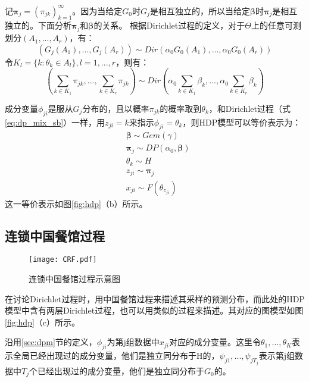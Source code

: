 记${\bm \pi}_j = {(\pi_{jk})}_{k=1}^\infty$。因为当给定$G_0$时$G_j$是相互独立的，所以当给定${\bm \beta}$时${\bm \pi}_j$是相互独立的。下面分析${\bm \pi}_j$和${\bm \beta}$的关系。
根据Dirichlet过程的定义，对于$\Theta$上的任意可测划分$(A_1,...,A_r)$，有：
\begin{equation}
(G_j(A_1),...,G_j(A_r)) \sim Dir(\alpha_0G_0(A_1),..., \alpha_0G_0(A_r))
\end{equation}
令$K_l = \{k:\theta_k \in A_l\},l = 1,...,r$，则有：
\begin{equation}
(\sum_{k \in K_1}\pi_{jk},...,\sum_{k \in K_r}\pi_{jk}) \sim Dir(\alpha_0\sum_{k \in K_1}\beta_{k},..., \alpha_0\sum_{k \in K_r}\beta_{k})
\end{equation}

成分变量$\phi_{ji}$是服从$G_j$分布的，且以概率$\pi_{jk}$的概率取到$\theta_k$，和Dirichlet过程（式\eqref{eq:dp_mix_sb}）一样，用$z_{ji} =k $来指示$\phi_{ji} = \theta_k$，则HDP模型可以等价表示为：
\begin{equation}
\begin{split}
& {\bm \beta} \sim Gem(\gamma)\\
& {\bm \pi}_j \sim DP(\alpha_0,{\bm \beta})\\
& \theta_k \sim H\\
& z_{ji} \sim {\bm \pi}_j\\
& x_{ji} \sim F(\theta_{z_{ji}}) 
\end{split}
\label{eq:hdp_mix_sb}
\end{equation}
这一等价表示如图\ref{fig:hdp}（b）所示。

\subsection{连锁中国餐馆过程}
\begin{figure}
\texttt{[image: CRF.pdf]} 

  \caption{连锁中国餐馆过程示意图} \label{fig:CRF}
\end{figure}
在讨论Dirichlet过程时，用中国餐馆过程来描述其采样的预测分布，而此处的HDP模型中含有两层Dirichlet过程，也可以用类似的过程来描述。其对应的图模型如图\ref{fig:hdp}（c）所示。

沿用\ref{sec:dpm}节的定义，$\phi_{ji}$为第j组数据中$x_{ji}$对应的成分变量。这里令$\theta_1,...,\theta_K$表示全局已经出现过的成分变量，他们是独立同分布于H的，$\psi_{j1},...,\psi_{jT_j}$表示第j组数据中$T_j$个已经出现过的成分变量，他们是独立同分布于$G_0$的。

